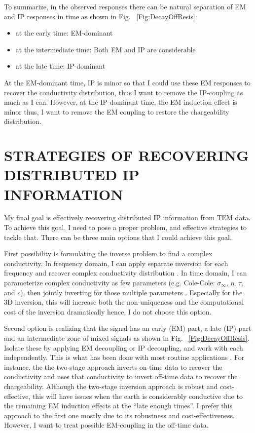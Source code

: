 \documentclass[letterpaper,11pt]{article}
\newcommand{\siginf}{\sigma_\infty}
\begin{document}
To summarize, in the observed responses there can be natural separation of EM and IP responses in time as shown in Fig. ~\ref{Fig:DecayOffResis}:
\begin{itemize}
  \item at the early time: EM-dominant
  \item at the intermediate time: Both EM and IP are considerable
  \item at the late time: IP-dominant
\end{itemize}
At the EM-dominant time, IP is minor so that I could use these EM responses to recover the conductivity distribution, thus I want to remove the IP-coupling as much as I can. However, at the IP-dominant time, the EM induction effect is minor thus, I want to remove the EM coupling to restore the chargeability distribution.  
\clearpage

\section{STRATEGIES OF RECOVERING DISTRIBUTED IP INFORMATION}
My final goal is effectively recovering distributed IP information from TEM data. To achieve this goal, I need to pose a proper problem, and effective strategies to tackle that. There can be three main options that I could achieve this goal. 

First possibility is formulating the inverse problem to find a complex conductivity. In frequency domain, I can apply separate inversion for each frequency and recover complex conductivity distribution \cite[]{Kemna2004,commer2011}. In time domain, I can parameterize complex conductivity as few parameters (e.g. Cole-Cole: $\siginf$, $\eta$, $\tau$, and $c$), then jointly inverting for those multiple parameters \cite[]{Fiandaca2012,Marchant2013,Xu2013}. Especially for the 3D inversion, this will increase both the non-uniqueness and the computational cost of the inversion dramatically hence, I do not choose this option. 

Second option is realizing that the signal has an early (EM) part, a late (IP) part and an intermediate zone of mixed signals as shown in Fig. ~\ref{Fig:DecayOffResis}. Isolate these by applying EM decoupling or IP decoupling, and work with each independently. This is what has been done with most routine applications \cite[]{doug1994}. For instance, the the two-stage approach inverts on-time data to recover the conductivity and uses that conductivity to invert off-time data to recover the chargeability. Although the two-stage inversion approach is robust and cost-effective, this will have issues when the earth is considerably conductive due to the remaining EM induction effects at the ``late enough times''. 
I prefer this approach to the first one mostly due to its robustness and cost-effectiveness. However, I want to treat possible EM-coupling in the off-time data. 
\end{document}
